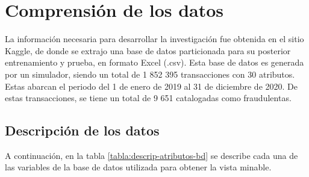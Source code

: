 \section{Comprensión de los datos}

La información necesaria para desarrollar la investigación fue obtenida en el sitio Kaggle, de donde se extrajo una base de datos particionada para su posterior entrenamiento y prueba, en formato Excel (.csv). Esta base de datos es generada por un simulador, siendo un total de 1 852 395 transacciones con 30 atributos. Estas abarcan el periodo del 1 de enero de 2019 al 31 de diciembre de 2020. De estas transacciones, se tiene un total de 9 651 catalogadas como fraudulentas.


\subsection{Descripción de los datos}

A continuación, en la tabla \ref{tabla:descrip-atributos-bd} se describe cada una de las variables de la base de datos utilizada para obtener la vista minable.

